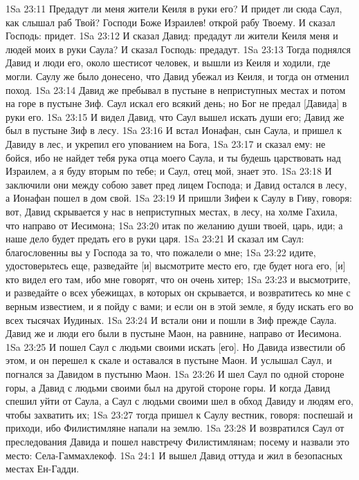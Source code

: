 1Sa 23:11  Предадут ли меня жители Кеиля в руки его? И придет ли сюда Саул, как слышал раб Твой? Господи Боже Израилев! открой рабу Твоему. И сказал Господь: придет.
1Sa 23:12  И сказал Давид: предадут ли жители Кеиля меня и людей моих в руки Саула? И сказал Господь: предадут.
1Sa 23:13  Тогда поднялся Давид и люди его, около шестисот человек, и вышли из Кеиля и ходили, где могли. Саулу же было донесено, что Давид убежал из Кеиля, и тогда он отменил поход.
1Sa 23:14  Давид же пребывал в пустыне в неприступных местах и потом на горе в пустыне Зиф. Саул искал его всякий день; но Бог не предал [Давида] в руки его.
1Sa 23:15  И видел Давид, что Саул вышел искать души его; Давид же был в пустыне Зиф в лесу.
1Sa 23:16  И встал Ионафан, сын Саула, и пришел к Давиду в лес, и укрепил его упованием на Бога,
1Sa 23:17  и сказал ему: не бойся, ибо не найдет тебя рука отца моего Саула, и ты будешь царствовать над Израилем, а я буду вторым по тебе; и Саул, отец мой, знает это.
1Sa 23:18  И заключили они между собою завет пред лицем Господа; и Давид остался в лесу, а Ионафан пошел в дом свой.
1Sa 23:19  И пришли Зифеи к Саулу в Гиву, говоря: вот, Давид скрывается у нас в неприступных местах, в лесу, на холме Гахила, что направо от Иесимона;
1Sa 23:20  итак по желанию души твоей, царь, иди; а наше дело будет предать его в руки царя.
1Sa 23:21  И сказал им Саул: благословенны вы у Господа за то, что пожалели о мне;
1Sa 23:22  идите, удостоверьтесь еще, разведайте [и] высмотрите место его, где будет нога его, [и] кто видел его там, ибо мне говорят, что он очень хитер;
1Sa 23:23  и высмотрите, и разведайте о всех убежищах, в которых он скрывается, и возвратитесь ко мне с верным известием, и я пойду с вами; и если он в этой земле, я буду искать его во всех тысячах Иудиных.
1Sa 23:24  И встали они и пошли в Зиф прежде Саула. Давид же и люди его были в пустыне Маон, на равнине, направо от Иесимона.
1Sa 23:25  И пошел Саул с людьми своими искать [его]. Но Давида известили об этом, и он перешел к скале и оставался в пустыне Маон. И услышал Саул, и погнался за Давидом в пустыню Маон.
1Sa 23:26  И шел Саул по одной стороне горы, а Давид с людьми своими был на другой стороне горы. И когда Давид спешил уйти от Саула, а Саул с людьми своими шел в обход Давиду и людям его, чтобы захватить их;
1Sa 23:27  тогда пришел к Саулу вестник, говоря: поспешай и приходи, ибо Филистимляне напали на землю.
1Sa 23:28  И возвратился Саул от преследования Давида и пошел навстречу Филистимлянам; посему и назвали это место: Села-Гаммахлекоф.
1Sa 24:1  И вышел Давид оттуда и жил в безопасных местах Ен-Гадди.
